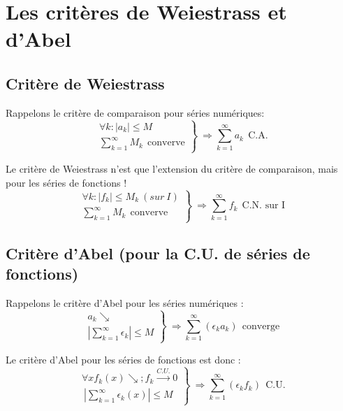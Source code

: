 \documentclass[11pt, a4paper, openany]{book}
\newcommand{\serie}{\sum_{k=1}^\infty}
\begin{document}
		\section{Les critères de Weiestrass et d'Abel}
		\subsection{Critère de Weiestrass}
		Rappelons le critère de comparaison pour séries numériques:
		\begin{equation}
			\left.\begin{array}{l}
			\forall k : |a_k| \leq M\\
			\serie M_k\ \ \text{converve}
			\end{array}\right\}\ \Rightarrow \serie a_k\ \ \text{C.A.}
		\end{equation}
							
		Le critère de Weiestrass n'est que l'extension du critère de comparaison, mais pour les séries de fonctions !
		\begin{equation}
			\left.\begin{array}{l}
			\forall k : |f_k| \leq M_k\ (sur\ I)\\
			\serie M_k\ \ \text{converve}
			\end{array}\right\}\ \Rightarrow \serie f_k\ \ \text{C.N. sur I}
		\end{equation}
							
							
		\setcounter{subsection}{2}
		\subsection{Critère d'Abel (pour la C.U. de séries de fonctions)}
		Rappelons  le critère d'Abel pour les séries numériques :
		\begin{equation}
			\left.\begin{array}{l}
			a_k \searrow\\
			|\serie \epsilon_k| \leq M
			\end{array}\right\}\ \Rightarrow \serie (\epsilon_k a_k)\ \ \text{converge}
		\end{equation}
							
		Le critère d'Abel pour les séries de fonctions est donc :
		\begin{equation}
			\left.\begin{array}{l}
			\forall x f_k(x) \searrow ; f_k  \overset{C.U.}{\rightarrow} 0 \\\
			|\serie \epsilon_k(x)| \leq M
			\end{array}\right\}\ \Rightarrow \serie (\epsilon_k f_k)\ \ \text{C.U.}
		\end{equation}
							
\end{document}
